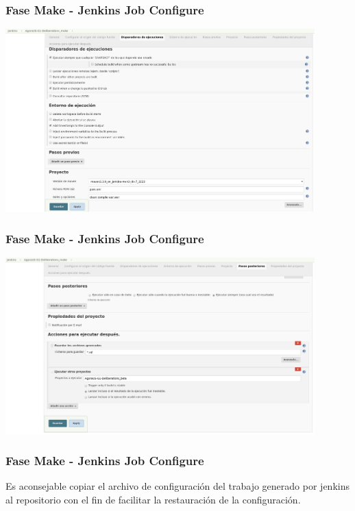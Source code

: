 \documentclass[
xcolor={svgnames},
hyperref={colorlinks,citecolor=DeepPink4,linkcolor=Black,urlcolor=DarkBlue}
]{beamer}
\begin{document}
\begin{frame}
	\frametitle{Fase Make - Jenkins Job Configure}
	\begin{center}
		\includegraphics[width=4.7in]{images/jenkins/make_a/jenkins_makeA_3.png}
	\end{center}
\end{frame}

\begin{frame}
	\frametitle{Fase Make - Jenkins Job Configure}
	\begin{center}
		\includegraphics[width=4.7in]{images/jenkins/make_a/jenkins_makeA_4.png}
	\end{center}
\end{frame}

\begin{frame}
	\frametitle{Fase Make - Jenkins Job Configure}
	Es aconsejable copiar el archivo de configuración del trabajo generado por jenkins al repositorio con el fin de facilitar la restauración de la configuración.
	
	\vspace{0.2in}


\end{frame}
\end{document}
